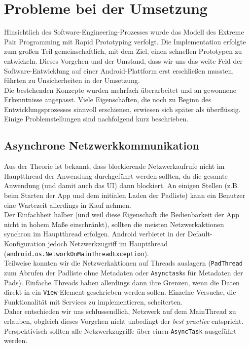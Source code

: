 \newpage
\section{Probleme bei der Umsetzung}
Hinsichtlich des Software-Engineering-Prozesses wurde das Modell des Extreme Pair Programming mit Rapid Prototyping verfolgt.
Die Implementation erfolgte zum großen Teil gemeinschaftlich, mit dem Ziel, einen schnellen Prototypen zu entwickeln.
Dieses Vorgehen und der Umstand, dass wir uns das weite Feld der Software-Entwicklung auf einer Android-Plattform erst erschließen mussten, führten zu Unsicherheiten in der Umsetzung.\\
Die bestehenden Konzepte wurden mehrfach überarbeitet und an gewonnene Erkenntnisse angepasst.
Viele Eigenschaften, die noch zu Beginn des Entwicklungsprozesses sinnvoll erschienen, erwiesen sich später als überflüssig.\\
Einige Problemstellungen sind nachfolgend kurz beschrieben.

\subsection{Asynchrone Netzwerkkommunikation}
Aus der Theorie ist bekannt, dass blockierende Netzwerkaufrufe nicht im Hauptthread der Anwendung durchgeführt werden sollten, da die gesamte Anwendung (und damit auch das UI) dann blockiert.
An einigen Stellen (z.B. beim Starten der App und dem initialen Laden der Padliste) kann ein Benutzer eine Wartezeit allerdings in Kauf nehmen.\\
Der Einfachheit halber (und weil diese Eigenschaft die Bedienbarkeit der App nicht in hohem Maße einschränkt), sollten die meisten Netzwerkaktionen synchron im Hauptthread erfolgen.
Android verbietet in der Default-Konfiguration jedoch Netzwerkzugriff im Hauptthread (\texttt{android.os.NetworkOnMainThreadException}).\\
Teilweise konnten wir die Netzwerkaktionen auf Threads auslagern (\texttt{PadThread} zum Abrufen der Padliste ohne Metadaten oder \texttt{Asynctask}s für Metadaten der Pads).
Einfache Threads haben allerdings dann ihre Grenzen, wenn die Daten direkt in ein \texttt{View}-Element geschrieben werden sollen.
Einzelne Versuche, die Funktionalität mit Services zu implementieren, scheiterten.\\
Daher entschieden wir uns schlussendlich, Netzwerk auf dem MainThread zu erlauben, obgleich dieses Vorgehen nicht unbedingt der \textit{best practice} entspricht.
Perspektivisch sollten alle Netzwerkzugriffe über einen \texttt{AsyncTask} ausgeführt werden.

